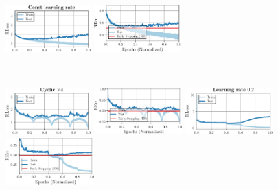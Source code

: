 \begin{figure}[t]
\begin{minipage}[t]{0.19\textwidth}
		\includegraphics[height=1.8cm]{plots_supp_training_curves_const_loss}
		
		\hspace*{-0.25cm}
		\includegraphics[height=1.8cm]{plots_supp_training_curves_const_error}
	\end{minipage}
	\\[2.5px]
		
	\begin{minipage}[t]{0.19\textwidth}
		\vspace*{0px}
		
		\includegraphics[height=1.8cm]{plots_supp_training_curves_cyc4_loss}
		
		\hspace*{-0.25cm}
		\includegraphics[height=1.8cm]{plots_supp_training_curves_cyc4_error}
	\end{minipage}
	\begin{minipage}[t]{0.19\textwidth}
		\vspace*{0px}
		 
		\includegraphics[height=1.8cm]{plots_supp_training_curves_lr02_loss}
		
		\hspace*{-0.25cm}
		\includegraphics[height=1.8cm]{plots_supp_training_curves_lr02_error}
	\end{minipage}
	\begin{minipage}[t]{0.19\textwidth}
		\vspace*{0px}
		

\end{minipage}
\end{figure}
